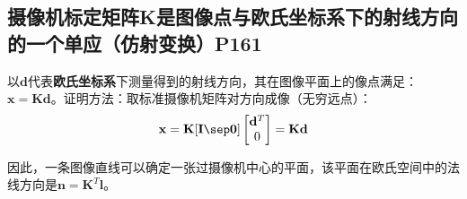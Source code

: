 \documentclass[11pt]{article}
\begin{document}
\subsection{摄像机标定矩阵K是图像点与欧氏坐标系下的射线方向的一个单应（仿射变换）P161}
以$\mathbold{d}$代表\textbf{欧氏坐标系}下测量得到的射线方向，其在图像平面上的像点满足：$\mathbold{x=Kd}$。证明方法：取标准摄像机矩阵对方向成像（无穷远点）：
\begin{equation*}
  \mathbf{x=K[I\sep 0]}\begin{bmatrix}
    \mathbf{d}^T \\0
  \end{bmatrix}=\mathbf{Kd}
\end{equation*}\par
因此，一条图像直线可以确定一张过摄像机中心的平面，该平面在欧氏空间中的法线方向是$\mathbold{n=K}^T\mathbold{l}$。
\end{document}
